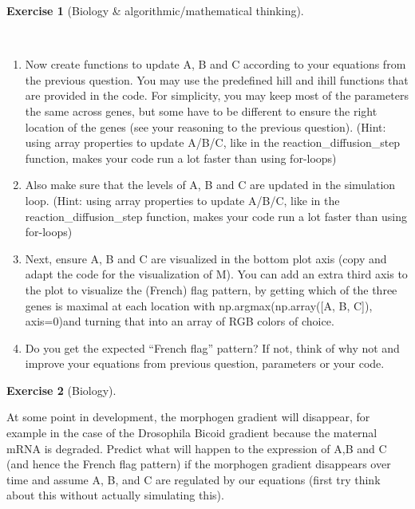 \documentclass[
  letterpaper,
  DIV=11,
  numbers=noendperiod]{scrreprt}
\providecommand{\tightlist}{%
  \setlength{\itemsep}{0pt}\setlength{\parskip}{0pt}}\usepackage{longtable,booktabs,array}
\theoremstyle{definition}
\newtheorem{exercise}{Exercise}[chapter]
\theoremstyle{remark}
\begin{document}
\begin{exercise}[Biology \& algorithmic/mathematical
thinking]\protect\hypertarget{exr-plain}{}\label{exr-plain}

~

\begin{enumerate}
\def\labelenumi{\alph{enumi}.}
\tightlist
\item
  Now create functions to update A, B and C according to your equations
  from the previous question. You may use the predefined hill and ihill
  functions that are provided in the code. For simplicity, you may keep
  most of the parameters the same across genes, but some have to be
  different to ensure the right location of the genes (see your
  reasoning to the previous question). (Hint: using array properties to
  update A/B/C, like in the reaction\_diffusion\_step function, makes
  your code run a lot faster than using for-loops)
\item
  Also make sure that the levels of A, B and C are updated in the
  simulation loop. (Hint: using array properties to update A/B/C, like
  in the reaction\_diffusion\_step function, makes your code run a lot
  faster than using for-loops)
\item
  Next, ensure A, B and C are visualized in the bottom plot axis (copy
  and adapt the code for the visualization of M). You can add an extra
  third axis to the plot to visualize the (French) flag pattern, by
  getting which of the three genes is maximal at each location with
  np.argmax(np.array({[}A, B, C{]}), axis=0)and turning that into an
  array of RGB colors of choice.
\item
  Do you get the expected ``French flag'' pattern? If not, think of why
  not and improve your equations from previous question, parameters or
  your code.
\end{enumerate}

\end{exercise}

\begin{exercise}[Biology]\protect\hypertarget{exr-plain}{}\label{exr-plain}

At some point in development, the morphogen gradient will disappear, for
example in the case of the Drosophila Bicoid gradient because the
maternal mRNA is degraded. Predict what will happen to the expression of
A,B and C (and hence the French flag pattern) if the morphogen gradient
disappears over time and assume A, B, and C are regulated by our
equations (first try think about this without actually simulating this).

\end{exercise}
\end{document}
